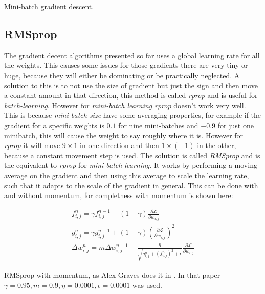 \begin{algorithm}[h]
 \DontPrintSemicolon
 \caption{Mini-batch gradient descent.}
 \label{algorithm:gradientdecent:mini-batch}
\end{algorithm}

\subsection{RMSprop}

The gradient decent algorithms presented so far uses a global learning rate for all the weights. This causes some issues for those gradients there are very tiny or huge, because they will either be dominating or be practically neglected. A solution to this is to not use the size of gradient but just the sign and then move a constant amount in that direction, this method is called \textit{rprop} and is useful for \textit{batch-learning}. However for \textit{mini-batch learning} \textit{rprop} doesn't work very well. This is because \textit{mini-batch-size} have some averaging properties, for example if the gradient for a specific weights is $0.1$ for nine mini-batches and $-0.9$ for just one minibatch, this will cause the weight to say roughly where it is. However for \textit{rprop} it will move $9 \times 1$ in one direction and then $1 \times (-1)$ in the other, because a constant movement step is used. The solution is called \textit{RMSprop} and is the equivalent to \textit{rprop} for \textit{mini-batch learning}. It works by performing a moving average on the gradient and then using this average to scale the learning rate, such that it adapts to the scale of the gradient in general. This can be done with and without momentum, for completness with momentum is shown here:

\begin{equationbox}[H]
\begin{equation*}
\begin{aligned}
f_{i,j}^n = \gamma f_{i,j}^{n-1} + (1 - \gamma) \frac{\partial \mathcal{L}}{\partial w_{i,j}} \\
g_{i,j}^n = \gamma g_{i,j}^{n-1} + (1 - \gamma) \left(\frac{\partial \mathcal{L}}{\partial w_{i,j}}\right)^2 \\
\Delta w_{i,j}^n = m \Delta w_{i,j}^{n-1} - \frac{\eta}{\sqrt{g_{i,j}^n + \left(f_{i,j}^n\right)^2 + \epsilon}} \frac{\partial \mathcal{L}}{\partial w_{i,j}}
\end{aligned}
\end{equation*}
\caption{RMSprop with momentum, as Alex Graves does it in \cite{graves-generating-sequences}. In that paper $\gamma = 0.95, m = 0.9, \eta = 0.0001, \epsilon = 0.0001$ was used.}
\end{equationbox}

